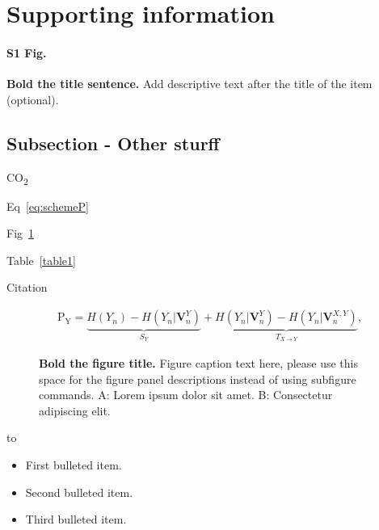 \documentclass[10pt,letterpaper]{article}
\begin{document}
\section*{Supporting information}
\paragraph*{S1 Fig.}
\label{S1_Fig}
{\bf Bold the title sentence.} Add descriptive text after the title of the item (optional).



\subsection*{Subsection - Other sturff}



CO\textsubscript{2}


Eq~\ref{eq:schemeP}


Fig~\ref{fig1}


Table~\ref{table1} 


Citation~\cite{LaGennusa2005}




\begin{eqnarray}
\label{eq:schemeP}
	\mathrm{P_Y} = \underbrace{H(Y_n) - H(Y_n|\mathbf{V}^{Y}_{n})}_{S_Y} + \underbrace{H(Y_n|\mathbf{V}^{Y}_{n})- H(Y_n|\mathbf{V}^{X,Y}_{n})}_{T_{X\rightarrow Y}},
\end{eqnarray}


\begin{figure}[!h]
\caption{{\bf Bold the figure title.}
Figure caption text here, please use this space for the figure panel descriptions instead of using subfigure commands. A: Lorem ipsum dolor sit amet. B: Consectetur adipiscing elit.}
\label{fig1}
\end{figure}
to


\begin{itemize}
	\item First bulleted item.
	\item Second bulleted item.
	\item Third bulleted item.
\end{itemize}
\end{document}
